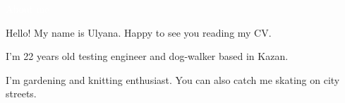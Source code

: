 
\newcommand{\AwardEntry}[4]{
\begin{tabular}{ l l r }
  \textbf{\textcolor{materialPurple}{#1}}\hspace{20pt} & \textbf{#2} & {\small \textcolor{textLightGray}{#4}}\\
  	& \normalsize #3\\
\end{tabular}
\vspace*{10pt}
}

\LARGE
\noindent\colorbox{materialPurple}
{\parbox[c][25pt][c]{\textwidth}{\hspace{15pt}\textcolor{white}{About me}}} %

\large
\vspace*{10pt}
\hspace*{2pt}
Hello! My name is Ulyana. Happy to see you reading my CV.

\hspace*{2pt}
I'm 22 years old testing engineer and dog-walker based in Kazan.

\hspace*{2pt}
 I'm gardening and knitting enthusiast. You can also catch me skating on city streets. 
\vspace*{5pt}
